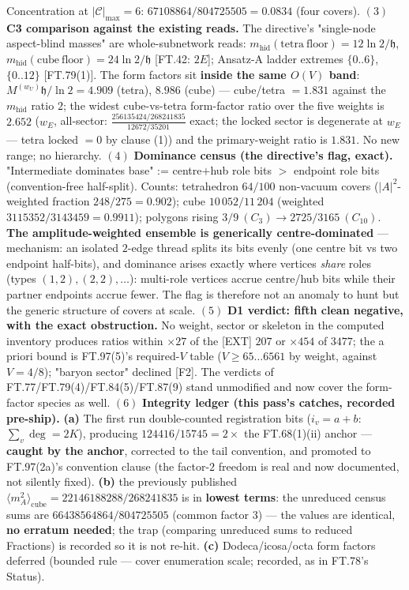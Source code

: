 \begin{theorem}
Concentration at $|\mathcal C|_{\max}=6$: $67108864/804725505=0.0834$ (four covers). $(3)$ \textbf{C3 comparison against the existing reads.} The directive's "single-node aspect-blind masses" are whole-subnetwork reads: $m_{\mathrm{hid}}(\mathrm{tetra\ floor})=12\ln2/\mathfrak h$, $m_{\mathrm{hid}}(\mathrm{cube\ floor})=24\ln2/\mathfrak h$ [FT.42: $2E$]; Ansatz-A ladder extremes $\{0..6\}$, $\{0..12\}$ [FT.79(1)]. The form factors sit \textbf{inside the same $O(V)$ band}: $M^{(w_U)}\mathfrak h/\ln2=4.909$ (tetra), $8.986$ (cube) — cube/tetra $=1.831$ against the $m_{\mathrm{hid}}$ ratio $2$; the widest cube-vs-tetra form-factor ratio over the five weights is $2.652$ ($w_E$, all-sector: $\tfrac{256135424/268241835}{12672/35201}$ exact; the locked sector is degenerate at $w_E$ — tetra locked $=0$ by clause (1)) and the primary-weight ratio is $1.831$. No new range; no hierarchy. $(4)$ \textbf{Dominance census (the directive's flag, exact).} "Intermediate dominates base" := centre$+$hub role bits $>$ endpoint role bits (convention-free half-split). Counts: tetrahedron $64/100$ non-vacuum covers ($|A|^2$-weighted fraction $248/275=0.902$); cube $10\,052/11\,204$ (weighted $3115352/3143459=0.9911$); polygons rising $3/9\ (C_3)\to2725/3165\ (C_{10})$. \textbf{The amplitude-weighted ensemble is generically centre-dominated} — mechanism: an isolated $2$-edge thread splits its bits evenly (one centre bit vs two endpoint half-bits), and dominance arises exactly where vertices \textit{share} roles (types $(1,2),(2,2),\dots$): multi-role vertices accrue centre/hub bits while their partner endpoints accrue fewer. The flag is therefore not an anomaly to hunt but the generic structure of covers at scale. $(5)$ \textbf{D1 verdict: fifth clean negative, with the exact obstruction.} No weight, sector or skeleton in the computed inventory produces ratios within $\times27$ of the [EXT] $207$ or $\times454$ of $3477$; the a priori bound is FT.97(5)'s required-$V$ table ($V\ge65\ldots6561$ by weight, against $V=4/8$); "baryon sector" declined [F2]. The verdicts of FT.77/FT.79(4)/FT.84(5)/FT.87(9) stand unmodified and now cover the form-factor species as well. $(6)$ \textbf{Integrity ledger (this pass's catches, recorded pre-ship).} \textbf{(a)} The first run double-counted registration bits ($i_v=a{+}b$: $\sum_v\deg=2K$), producing $124416/15745=2\times$ the FT.68(1)(ii) anchor — \textbf{caught by the anchor}, corrected to the tail convention, and promoted to FT.97(2a)'s convention clause (the factor-$2$ freedom is real and now documented, not silently fixed). \textbf{(b)} the previously published $\langle m_A^2\rangle_{\mathrm{cube}}=22146188288/268241835$ is in \textbf{lowest terms}: the unreduced census sums are $66438564864/804725505$ (common factor $3$) — the values are identical, \textbf{no erratum needed}; the trap (comparing unreduced sums to reduced Fractions) is recorded so it is not re-hit. \textbf{(c)} Dodeca/icosa/octa form factors deferred (bounded rule — cover enumeration scale; recorded, as in FT.78's Status).


\end{theorem}

